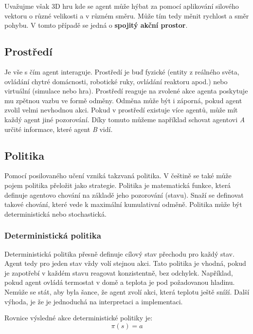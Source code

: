 \bigskip

Uvažujme však 3D hru kde se agent může hýbat za pomocí aplikování silového vektoru o různé velikosti a v různém směru.
Může tím tedy měnit rychlost a směr pohybu.
V tomto případě se jedná o \textbf{spojitý akční prostor}.

\subsection{Prostředí}\label{subsec:prostredi2}

Je vše s čím agent interaguje.
Prostředí je buď fyzické (entity z reálného světa, ovládání chytré domácnosti, robotické ruky, ovládání reaktoru apod.) nebo virtuální (simulace nebo hra).
Prostředí reaguje na zvolené akce agenta poskytuje mu zpětnou vazbu ve formě odměny.
Odměna může být i záporná, pokud agent zvolil velmi nevhodnou akci.
Pokud v prostředí existuje více agentů, může mít každý agent jiné pozorování.
Díky tomuto můžeme například schovat agentovi \textit{A} určité informace, které agent \textit{B} vidí.

\subsection{Politika}\label{subsec:politika}

Pomocí posilovaného učení vzniká takzvaná politika.
V češtině se také může pojem politika přeložit jako strategie.
Politika je matematická funkce, která definuje agentovo chování na základě jeho pozorování (stavu).
Snaží se definovat takové chování, které vede k maximální kumulativní odměně.
Politika může být deterministická nebo stochastická.

  \subsubsection*{Deterministická politika}
  
  Deterministická politika přesně definuje cílový stav přechodu pro každý stav.
  Agent tedy pro jeden stav vždy volí stejnou akci.
  Tato politika je vhodná, pokud je zapotřebí v každém stavu reagovat konzistentně, bez odchylek.
  Například, pokud agent ovládá termostat v domě a teplota je pod požadovanou hladinu.
  Nemůže se stát, aby byla šance, že agent zvolí akci, která teplotu ještě sníží.
  Další výhoda, je že je jednoduchá na interpretaci a implementaci.\cite{Policies}

  Rovnice výsledné akce deterministické politiky je:
  \begin{equation}
    \pi(s) = a\label{eq:policy_deterministic}
  \end{equation}


